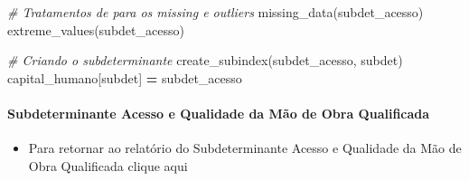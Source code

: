 \documentclass[
  12,
  dvipsnames]{article}
\newenvironment{Shaded}{\begin{snugshade}}{\end{snugshade}}
\newcommand{\CommentTok}[1]{\textcolor[rgb]{0.56,0.35,0.01}{\textit{#1}}}
\newcommand{\NormalTok}[1]{#1}
\newcommand{\OperatorTok}[1]{\textcolor[rgb]{0.81,0.36,0.00}{\textbf{#1}}}
\providecommand{\tightlist}{%
  \setlength{\itemsep}{0pt}\setlength{\parskip}{0pt}}
\begin{document}
\begin{Shaded}
\begin{Highlighting}[]
\CommentTok{\# Tratamentos de para os missing e outliers}
\NormalTok{missing\_data(subdet\_acesso)}
\NormalTok{extreme\_values(subdet\_acesso)}

\CommentTok{\# Criando o subdeterminante}
\NormalTok{create\_subindex(subdet\_acesso, subdet)}
\NormalTok{capital\_humano[subdet] }\OperatorTok{=}\NormalTok{ subdet\_acesso}
\end{Highlighting}
\end{Shaded}

\hypertarget{script_2.6.2}{%
\paragraph*{Subdeterminante Acesso e Qualidade da Mão de Obra
Qualificada}\label{script_2.6.2}}

\begin{itemize}
\tightlist
\item
  Para retornar ao relatório do Subdeterminante Acesso e Qualidade da
  Mão de Obra Qualificada
  \protect\hypertarget{subdet_obra_qualificada}{}{clique aqui}
\end{itemize}
\end{document}

